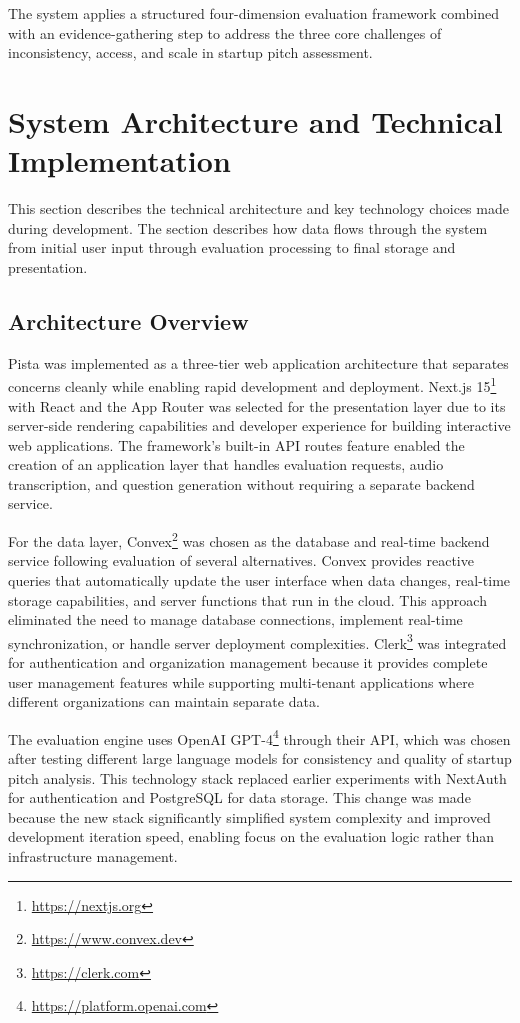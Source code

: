 The system applies a structured four-dimension evaluation framework combined with an evidence-gathering step to address the three core challenges of inconsistency, access, and scale in startup pitch assessment.

\section{System Architecture and Technical Implementation} \label{sec:system-design}

This section describes the technical architecture and key technology choices made during development. The section describes how data flows through the system from initial user input through evaluation processing to final storage and presentation.

\subsection{Architecture Overview}\label{subsec:architecture-overview}
Pista was implemented as a three-tier web application architecture that separates concerns cleanly while enabling rapid development and deployment. Next.js 15\footnote{\url{https://nextjs.org}} with React and the App Router was selected for the presentation layer due to its server-side rendering capabilities and developer experience for building interactive web applications. The framework's built-in API routes feature enabled the creation of an application layer that handles evaluation requests, audio transcription, and question generation without requiring a separate backend service.

For the data layer, Convex\footnote{\url{https://www.convex.dev}} was chosen as the database and real-time backend service following evaluation of several alternatives. Convex provides reactive queries that automatically update the user interface when data changes, real-time storage capabilities, and server functions that run in the cloud. This approach eliminated the need to manage database connections, implement real-time synchronization, or handle server deployment complexities. Clerk\footnote{\url{https://clerk.com}} was integrated for authentication and organization management because it provides complete user management features while supporting multi-tenant applications where different organizations can maintain separate data.

The evaluation engine uses OpenAI GPT-4\footnote{\url{https://platform.openai.com}} through their API, which was chosen after testing different large language models for consistency and quality of startup pitch analysis. This technology stack replaced earlier experiments with NextAuth for authentication and PostgreSQL for data storage. This change was made because the new stack significantly simplified system complexity and improved development iteration speed, enabling focus on the evaluation logic rather than infrastructure management.

